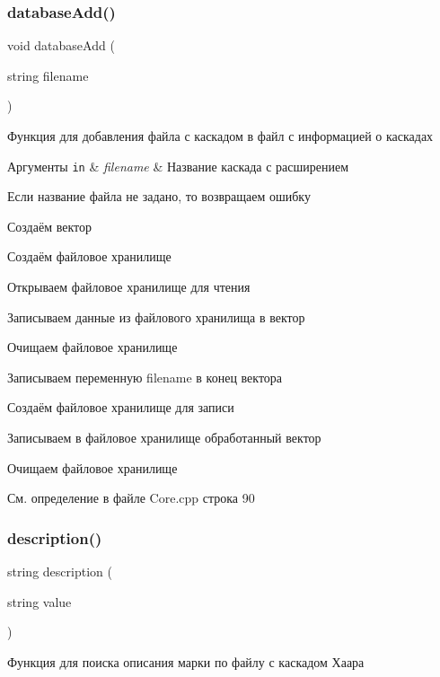 \subsubsection{\texorpdfstring{database\+Add()}{databaseAdd()}}
{\footnotesize\ttfamily void database\+Add (\begin{DoxyParamCaption}\item[{string}]{filename }\end{DoxyParamCaption})}



Функция для добавления файла с каскадом в файл с информацией о каскадах 


\begin{DoxyParams}[1]{Аргументы}
\mbox{\tt in}  & {\em filename} & Название каскада с расширением \\
\hline
\end{DoxyParams}
Если название файла не задано, то возвращаем ошибку

Создаём вектор

Создаём файловое хранилище

Открываем файловое хранилище для чтения

Записываем данные из файлового хранилища в вектор

Очищаем файловое хранилище

Записываем переменную filename в конец вектора

Создаём файловое хранилище для записи

Записываем в файловое хранилище обработанный вектор

Очищаем файловое хранилище 

См. определение в файле Core.\+cpp строка 90

\mbox{\label{group__corecpp_gaa85ae460901348b74381239ce0517d5f}} 
\subsubsection{\texorpdfstring{description()}{description()}}
{\footnotesize\ttfamily string description (\begin{DoxyParamCaption}\item[{string}]{value }\end{DoxyParamCaption})}



Функция для поиска описания марки по файлу с каскадом Хаара 


